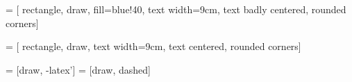 \usepackage{tikz}
\usetikzlibrary{
	shapes,
    arrows,
    shapes.geometric,
    positioning,
}

 = [
	rectangle,
    draw,
    fill=blue!40,
    text width=9cm,
    text badly centered,
    rounded corners]

 = [
	rectangle,
	draw,
    text width=9cm,
    text centered,
    rounded corners]

 = [draw, -latex']
 = [draw, dashed]

